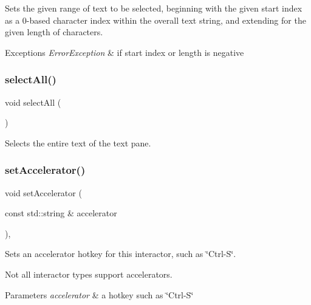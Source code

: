 Sets the given range of text to be selected, beginning with the given start index as a 0-\/based character index within the overall text string, and extending for the given length of characters. 


\begin{DoxyExceptions}{Exceptions}
{\em Error\+Exception} & if start index or length is negative \\
\hline
\end{DoxyExceptions}
\mbox{\label{classGBrowserPane_ab6658ed404200bd7aaca5629db064645}} 
\subsubsection{\texorpdfstring{select\+All()}{selectAll()}}
{\footnotesize\ttfamily void select\+All (\begin{DoxyParamCaption}{ }\end{DoxyParamCaption})\hspace{0.3cm}{\ttfamily [virtual]}}



Selects the entire text of the text pane. 

\mbox{\label{classGInteractor_ad15f102f62e2960576012f1aa0ba4b2e}} 
\subsubsection{\texorpdfstring{set\+Accelerator()}{setAccelerator()}}
{\footnotesize\ttfamily void set\+Accelerator (\begin{DoxyParamCaption}\item[{const std\+::string \&}]{accelerator }\end{DoxyParamCaption})\hspace{0.3cm}{\ttfamily [virtual]}, {\ttfamily [inherited]}}



Sets an accelerator hotkey for this interactor, such as \char`\"{}\+Ctrl-\/\+S\char`\"{}. 

Not all interactor types support accelerators. 
\begin{DoxyParams}{Parameters}
{\em accelerator} & a hotkey such as \char`\"{}\+Ctrl-\/\+S\char`\"{} \\
\hline
\end{DoxyParams}


